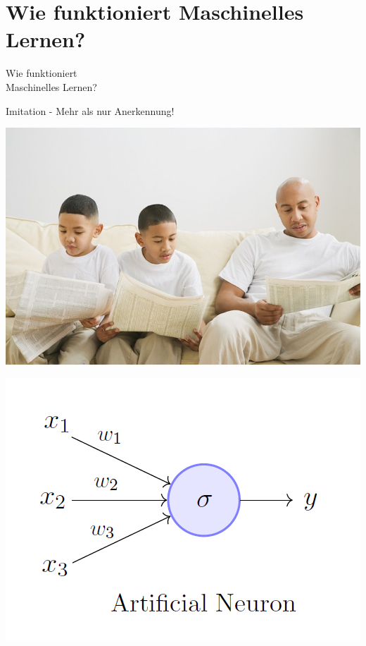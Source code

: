 \documentclass[aspectratio=43,x11names]{beamer}
\begin{document}

\section{Wie funktioniert Maschinelles Lernen?}

\begin{frame}
\begin{center}
\huge
Wie funktioniert\\Maschinelles Lernen?
\end{center}
\end{frame}

\begin{frame}
\begin{center}
\Large Imitation - Mehr als nur Anerkennung!
\medskip\medskip

\includegraphics[scale=0.35]{images/imitation}
\end{center}
\end{frame}

\begin{frame}
\begin{center}
\includegraphics[width=\textwidth]{images/perceptron} 
\end{center}
\end{frame}
\end{document}
